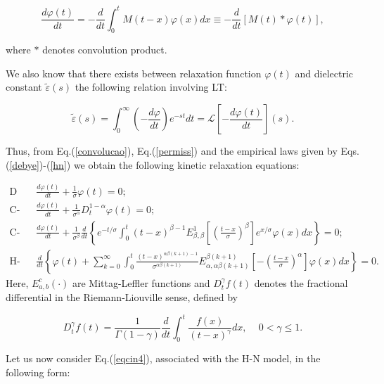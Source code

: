 \documentclass[12pt]{amsart}
\numberwithin{equation}{section}
\begin{document}
\begin{equation}
\frac{d\varphi(t)}{dt}=-\frac{d}{dt}\int_0^tM(t-x)\varphi(x)dx\equiv-\frac{d}{dt}\left[M(t)\ast\varphi(t)\right],
\label{convolucao}
\end{equation}
		
where $\ast$ denotes convolution product. 
		
We also know that there exists between relaxation function $\varphi(t)$ and
dielectric constant $\tilde{\varepsilon}(s)$ the following relation
involving LT: 
		
\begin{equation}
\tilde{\varepsilon}(s)=\int_0^{\infty}\left(-\frac{d\varphi}{dt}\right)
e^{-s t}dt=\mathscr{L}\left[-\frac{d\varphi(t)}{dt}\right](s).
\label{permiss}
\end{equation}
		
Thus, from Eq.(\ref{convolucao}), Eq.(\ref{permiss}) and the empirical laws
given by Eqs.(\ref{debye})-(\ref{hn}) we obtain the following kinetic
relaxation equations: 

\begin{eqnarray}
\mbox{D}& &\frac{d\varphi(t)}{dt}+\frac{1}{\sigma}\varphi(t)=0 ; \label{eqcin1}\\
\mbox{C-C}& &\frac{d\varphi(t)}{dt}+\frac{1}{\sigma^{\alpha}}D_{t}^{1-\alpha}\varphi(t)=0 ; \\
\mbox{C-D}&&\frac{d\varphi(t)}{dt}+\frac{1}{\sigma^{\beta}}\frac{d}{dt}\left\{e^{-t/\sigma}\int_0^t(t-x)^{\beta-1}E_{\beta,\beta}^{1}\left[\left(\frac{t-x}{\sigma}\right)^{\beta}\right]e^{x/\sigma}\varphi(x)dx\right\}=0 ; \label{eqcin3}\\
\mbox{H-N}&
&\frac{d}{dt}\left\{\varphi(t)+
\sum_{k=0}^{\infty}\int_0^t\frac{(t-x)^{\alpha\beta(k+1)-1}}{\sigma^{\alpha\beta(k+1)}}
E_{\alpha,\alpha\beta(k+1)}^{\beta(k+1)}\left[-\left(\frac{t-x}{\sigma}\right)^{\alpha}\right]\varphi(x)dx\right\}=0 . \label{eqcin4}
\end{eqnarray}
Here, $E_{a,b}^{c}(\cdot)$ are Mittag-Leffler functions and $D_{t}^{\gamma}f(t)$ denotes the fractional differential in the 
Riemann-Liouville sense, defined by 
		
\begin{equation}
D_{t}^{\gamma}f(t)=\frac{1}{\Gamma(1-\gamma)}\frac{d}{dt}\int_0^t
\frac{f(x)}{(t-x)^{\gamma}}dx,\,\,\,\,\,\,\,0<\gamma\leq1.
\label{riemann}
\end{equation}
		
Let us now consider Eq.(\ref{eqcin4}), associated with the H-N model, in the
following form: 
\end{document}
